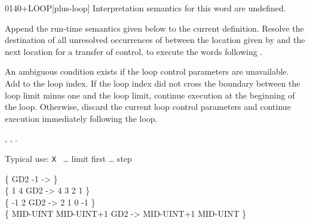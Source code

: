 \begin{worddef}{0140}{+LOOP}[plus-loop]
\interpret
	Interpretation semantics for this word are undefined.

\compile

	Append the run-time semantics given below to the current
	definition. Resolve the destination of all unresolved
	occurrences of  between the location given
	by  and the next location for a transfer of
	control, to execute the words following .

\runtime

	An ambiguous condition exists if the loop control parameters
	are unavailable. Add  to the loop index. If the loop
	index did not cross the boundary between the loop limit minus
	one and the loop limit, continue execution at the beginning
	of the loop. Otherwise, discard the current loop control
	parameters and continue execution immediately following the
	loop.

\see {},
	,
	.

	\begin{defer}
	\rationale %
		Typical use:
			\word{:} \texttt{X} ~{\ldots} limit first 
				{\ldots} step 
			\word{;}

	\testing
		\{ \word{:} GD2   -1  \word{;} -> \} \\
		\{        1          4 GD2 -> 4 3 2 1 \} \\
		\{       -1          2 GD2 -> 2 1 0 -1 \} \\
		\{ MID-UINT MID-UINT+1 GD2 -> MID-UINT+1 MID-UINT \}
	\end{defer}
\end{worddef}


